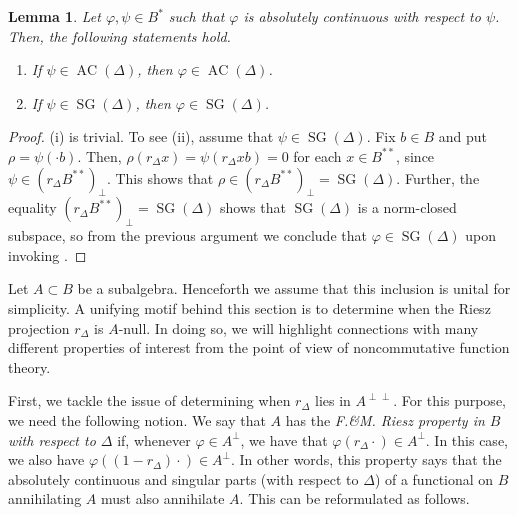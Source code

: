 \documentclass[10pt]{amsart}
\renewcommand{\phi}{\varphi}
\newcommand{\AC}{\operatorname{AC}}
\newcommand{\SG}{\operatorname{SG}}
\newtheorem{lemma}{Lemma}[section]
\theoremstyle{definition}
\begin{document}
\begin{lemma}\label{L:SG}
Let $\phi,\psi\in B^*$ such that $\phi$ is absolutely continuous with respect to $\psi$. Then, the following statements hold.
\begin{enumerate}[{\rm (i)}]
\item If $\psi\in \AC(\Delta)$, then $\phi\in \AC(\Delta)$.
\item If $\psi\in \SG(\Delta)$, then $\phi\in \SG(\Delta)$.
\end{enumerate}
\end{lemma}
\begin{proof}
(i) is trivial. To see (ii), assume that $\psi\in \SG(\Delta)$. Fix $b\in B$ and put $\rho=\psi(\cdot b)$. Then, $\rho(r_\Delta x)=\psi(r_\Delta x b)=0$ for each $x\in B^{**}$, since $\psi\in (r_\Delta B^{**})_\perp$. This shows that $\rho\in (r_\Delta B^{**})_\perp=\SG(\Delta)$. Further, the equality  $(r_\Delta B^{**})_\perp=\SG(\Delta)$ shows that $\SG(\Delta)$ is a norm-closed subspace, so from the previous argument we conclude that $\phi\in \SG(\Delta)$ upon invoking \cite[Theorem 2.7]{CT2023Henkin}.
\end{proof}


Let $A\subset B$ be a subalgebra. Henceforth we assume that this inclusion is unital for simplicity. 
A unifying motif behind this section
is to determine when the Riesz projection $r_\Delta$ is $A$-null. In doing so, we will highlight connections with many different properties of interest from the point of view of noncommutative function theory.

First, we tackle the issue of determining when $r_\Delta$ lies in $A^{\perp\perp}$. For this purpose, we need the following notion. We say that $A$ has the \emph{F.\&M. Riesz property in $B$ with respect to $\Delta$} if, whenever $\phi\in A^\perp$, we have that $\phi(r_\Delta \cdot)\in A^{\perp}$. In this case, we also have $\phi((1-r_\Delta) \cdot)\in A^{\perp}$. In other words, this property says that the absolutely continuous and singular parts (with respect to $\Delta$) of a functional on $B$ annihilating $A$ must also annihilate $A$. This can be reformulated as follows.
\end{document}
